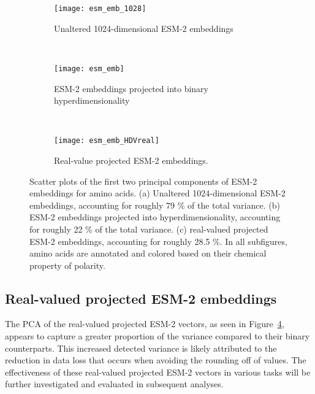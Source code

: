 \begin{figure}[H]
\centering
\begin{minipage}[b]{.5\textwidth}
    \begin{subfigure}[b]{\textwidth}
    \texttt{[image: esm\_emb\_1028]}
    \caption{Unaltered 1024-dimensional ESM-2 embeddings}
    \label{fig:AAesm_pure}
\end{subfigure}
\end{minipage}
\\
\centering
\begin{minipage}[b]{.5\textwidth}
\begin{subfigure}[b]{\textwidth}
    \texttt{[image: esm\_emb]}
    \caption{ESM-2 embeddings projected into binary hyperdimensionality}
    \label{fig:AAesm}
\end{subfigure}
\end{minipage}
\\
\centering
\begin{minipage}[b]{.5\textwidth}
\begin{subfigure}[b]{\textwidth}
    \texttt{[image: esm\_emb\_HDVreal]}
    \caption{Real-value projected ESM-2 embeddings.}\label{fig:AAesmreal}
\end{subfigure}
\end{minipage}
\caption{Scatter plots of the first two principal components of ESM-2 embeddings for amino acids. (a) Unaltered 1024-dimensional ESM-2 embeddings, accounting for roughly 79 \% of the total variance. (b) ESM-2 embeddings projected into hyperdimensionality, accounting for roughly 22 \% of the total variance. (c) real-valued projected ESM-2 embeddings, accounting for roughly 28.5 \%. In all subfigures, amino acids are annotated and colored based on their chemical property of polarity.}
\end{figure}

\subsection{Real-valued projected ESM-2 embeddings}
The PCA of the real-valued projected ESM-2 vectors, as seen in Figure~\ref{fig:AAesmreal}, appears to capture a greater proportion of the variance compared to their binary counterparts. This increased detected variance is likely attributed to the reduction in data loss that occurs when avoiding the rounding off of values. The effectiveness of these real-valued projected ESM-2 vectors in various tasks will be further investigated and evaluated in subsequent analyses.

